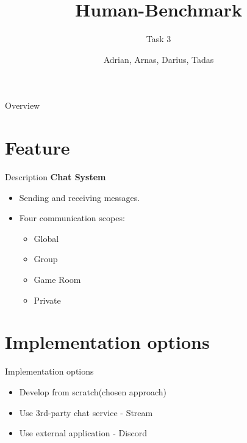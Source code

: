 \documentclass[aspectratio=169,xcolor=dvipsnames]{beamer}
\title{Human-Benchmark}
\subtitle{Task 3}
\author{Adrian, Arnas, Darius, Tadas}
\institute
{
    Matematikos ir informatikos fakultetas \\
    Vilniaus universitetas %
}
\begin{document}
\begin{frame}
    \titlepage
\end{frame}

\begin{frame}{Overview}
    \tableofcontents
\end{frame}


\section{Feature}
\begin{frame}{Description}
\textbf{Chat System}
\begin{itemize}
    \item Sending and receiving messages.
    \item Four communication scopes:
    \begin{itemize}
        \item Global
        \item Group
        \item Game Room
        \item Private
    \end{itemize}
\end{itemize}
\end{frame}


\section{Implementation options}
\begin{frame}{Implementation options}
\begin{itemize}
    \item Develop from scratch(chosen approach)
    \item Use 3rd-party chat service - Stream
    \item Use external application - Discord
\end{itemize}
\end{frame}
\end{document}

